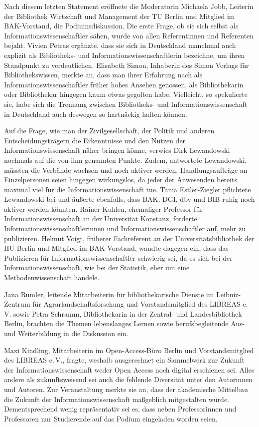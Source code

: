 \documentclass[a4paper,
fontsize=11pt,
oneside,
numbers=noperiodatend,
parskip=half-,
bibliography=totoc,
final
]{scrartcl}
\begin{document}
Nach diesem letzten Statement eröffnete die Moderatorin Michaela Jobb,
Leiterin der Bibliothek Wirtschaft und Management der TU Berlin und
Mitglied im BAK-Vorstand, die Podiumsdiskussion. Die erste Frage, ob sie
sich selbst als Informationswissenschaftler sähen, wurde von allen
Referentinnen und Referenten bejaht. Vivien Petras ergänzte, dass sie
sich in Deutschland manchmal auch explizit als Bibliotheks- und
Informationswissenschaftlerin bezeichne, um ihren Standpunkt zu
verdeutlichen. Elisabeth Simon, Inhaberin des Simon Verlags für
Bibliothekswissen, merkte an, dass man ihrer Erfahrung nach als
Informationswissenschaftler früher hohes Ansehen genossen, als
Bibliothekarin oder Bibliothekar hingegen kaum etwas gegolten habe.
Vielleicht, so spekulierte sie, habe sich die Trennung zwischen
Bibliotheks- und Informationswissenschaft in Deutschland auch deswegen
so hartnäckig halten können.

Auf die Frage, wie man der Zivilgesellschaft, der Politik und anderen
Entscheidungsträgern die Erkenntnisse und den Nutzen der
Informationswissenschaft näher bringen könne, verwies Dirk Lewandowski
nochmals auf die von ihm genannten Punkte. Zudem, antwortete
Lewandowski, müssten die Verbände wachsen und noch aktiver werden.
Handlungsaufträge an Einzelpersonen seien hingegen wirkungslos, da jeder
der Anwesenden bereits maximal viel für die Informationswissenschaft
tue. Tania Estler-Ziegler pflichtete Lewandowski bei und äußerte
ebenfalls, dass BAK, DGI, dbv und BIB ruhig noch aktiver werden könnten.
Rainer Kuhlen, ehemaliger Professor für Informationswissenschaft an der
Universität Konstanz, forderte Informationswissenschaftlerinnen und
Informationswissenschaftler auf, mehr zu publizieren. Helmut Voigt,
früherer Fachreferent an der Universitätsbibliothek der HU Berlin und Mitglied im BAK-Vorstand,
wandte dagegen ein, dass das Publizieren für Informationswissenschaftler
schwierig sei, da es sich bei der Informationswissenschaft, wie bei der
Statistik, eher um eine Methodenwissenschaft handele.

Jana Rumler, leitende Mitarbeiterin für bibliothekarische Dienste im
Leibniz-Zentrum für Agrarlandschaftsforschung und Vorstandsmitglied des
LIBREAS e.\,V. sowie Petra Schramm, Bibliothekarin in der Zentral- und
Landesbibliothek Berlin, brachten die Themen lebenslanges Lernen sowie
berufsbegleitende Aus- und Weiterbildung in die Diskussion ein.

Maxi Kindling, Mitarbeiterin im Open-Access-Büro Berlin und
Vorstandsmitglied des LIBREAS e.\,V., fragte, weshalb ausgerechnet ein
Sammelwerk zur Zukunft der Informationswissenschaft weder Open Access
noch digital erschienen sei. Alles andere als zukunftsweisend sei auch
die fehlende Diversität unter den Autorinnen und Autoren. Zur
Veranstaltung merkte sie an, dass der akademische Mittelbau die Zukunft
der Informationswissenschaft maßgeblich mitgestalten würde.
Dementsprechend wenig repräsentativ sei es, dass neben Professorinnen
und Professoren nur Studierende auf das Podium eingeladen worden seien.
\end{document}
